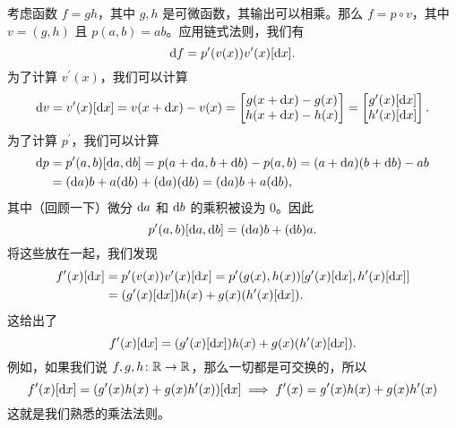 \documentclass[../../book-main.tex]{subfiles}
\begin{document}
\begin{example}
    考虑函数 \(f = gh\)，其中 \(g, h\) 是可微函数，其输出可以相乘。那么 \(f = p \circ v\)，其中 \(v = (g, h)\) 且 \(p(a, b) = ab\)。应用链式法则，我们有
    \begin{equation}
        \odif{f} = p^{\prime}(v(x))v^{\prime}(x)[\odif{x}].
    \end{equation}
    为了计算 \(v^{\prime}(x)\)，我们可以计算
    \begin{equation}
        \odif{v} = v^{\prime}(x)[\odif{x}] = v(x + \odif{x}) - v(x) = \mat{g(x + \odif{x}) - g(x) \\ h(x + \odif{x}) - h(x)} = \mat{g^{\prime}(x)[\odif{x}] \\ h^{\prime}(x)[\odif{x}]}.
    \end{equation}
    为了计算 \(p^{\prime}\)，我们可以计算
    \begin{align}
        \odif{p} 
        &= p^{\prime}(a, b)[\odif{a}, \odif{b}] = p(a + \odif{a}, b + \odif{b}) - p(a, b) = (a + \odif{a})(b + \odif{b}) - ab \\
        &= (\odif{a})b + a(\odif{b}) + (\odif{a})(\odif{b}) = (\odif{a})b + a(\odif{b}),
    \end{align}
    其中（回顾一下）微分 \(\odif{a}\) 和 \(\odif{b}\) 的乘积被设为 \(0\)。因此
    \begin{equation}
        p^{\prime}(a, b)[\odif{a}, \odif{b}] = (\odif{a})b + (\odif{b})a.
    \end{equation}
    将这些放在一起，我们发现
    \begin{align}
        f^{\prime}(x)[\odif{x}] 
        &= p^{\prime}(v(x))v^{\prime}(x)[\odif{x}] = p^{\prime}(g(x), h(x))[g^{\prime}(x)[\odif{x}], h^{\prime}(x)[\odif{x}]] \\
        &= (g^{\prime}(x)[\odif{x}])h(x) + g(x)(h^{\prime}(x)[\odif{x}]).
    \end{align}
    这给出了
    \begin{equation}
        f^{\prime}(x)[\odif{x}] = (g^{\prime}(x)[\odif{x}])h(x) + g(x)(h^{\prime}(x)[\odif{x}]).
    \end{equation}
    例如，如果我们说 \(f, g, h \colon \mathbb{R} \to \mathbb{R}\)，那么一切都是可交换的，所以
    \begin{equation}
        f^{\prime}(x)[\odif{x}] = (g^{\prime}(x)h(x) + g(x)h^{\prime}(x))[\odif{x}] \implies f^{\prime}(x) = g^{\prime}(x)h(x) + g(x)h^{\prime}(x)
    \end{equation}
    这就是我们熟悉的乘法法则。
\end{example}
\end{document}
